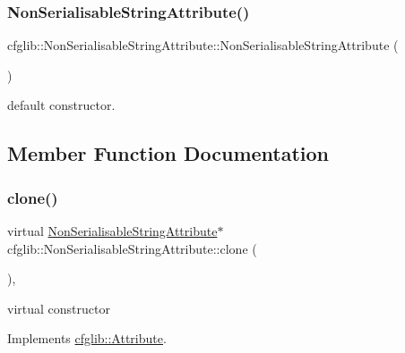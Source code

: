 \subsubsection{\texorpdfstring{Non\+Serialisable\+String\+Attribute()}{NonSerialisableStringAttribute()}\hspace{0.1cm}{\footnotesize\ttfamily [2/2]}}
{\footnotesize\ttfamily cfglib\+::\+Non\+Serialisable\+String\+Attribute\+::\+Non\+Serialisable\+String\+Attribute (\begin{DoxyParamCaption}{ }\end{DoxyParamCaption})\hspace{0.3cm}{\ttfamily [inline]}}

default constructor. 

\subsection{Member Function Documentation}
\mbox{\label{classcfglib_1_1NonSerialisableStringAttribute_a5a7857efb5a59c478ef31266ddfd2f2c}} 
\subsubsection{\texorpdfstring{clone()}{clone()}}
{\footnotesize\ttfamily virtual \hyperlink{classcfglib_1_1NonSerialisableStringAttribute}{Non\+Serialisable\+String\+Attribute}$\ast$ cfglib\+::\+Non\+Serialisable\+String\+Attribute\+::clone (\begin{DoxyParamCaption}{ }\end{DoxyParamCaption})\hspace{0.3cm}{\ttfamily [inline]}, {\ttfamily [virtual]}}

virtual constructor 

Implements \hyperlink{classcfglib_1_1Attribute_a107366042fdafe881215426059fec3f8}{cfglib\+::\+Attribute}.

\mbox{\label{classcfglib_1_1NonSerialisableStringAttribute_a3fb5338650a4569eb9b22b5419c9b6b5}} 
